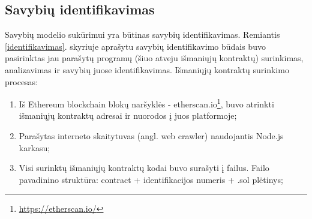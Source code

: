 \documentclass{VUMIFPSkursinis}
\begin{document}
\subsection{Savybių identifikavimas} \label{isskyrimas}

Savybių modelio sukūrimui yra būtinas savybių identifikavimas. Remiantis \ref{identifikavimas}. skyriuje aprašytu savybių identifikavimo būdais buvo pasirinktas jau parašytų programų (šiuo atveju išmaniųjų kontraktų) surinkimas, analizavimas ir savybių juose identifikavimas. Išmaniųjų kontraktų surinkimo procesas:
\begin{enumerate}
\item Iš Ethereum blockchain blokų naršyklės - etherscan.io\footnote{\url{https://etherscan.io/}}, buvo atrinkti išmaniųjų kontraktų adresai ir nuorodos į juos platformoje;
\item Parašytas interneto skaitytuvas (angl. web crawler) naudojantis Node.js karkasu;
\item Visi surinktų išmaniųjų kontraktų kodai buvo surašyti į failus. Failo pavadinino struktūra: contract + identifikacijos numeris + .sol plėtinys;
\end{enumerate}
\end{document}
